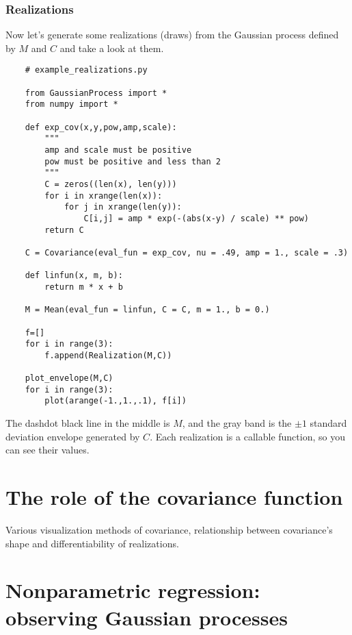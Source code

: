 \documentclass{report}
\begin{document}
\subsubsection{Realizations} 
Now let's generate some realizations (draws) from the Gaussian process defined by $M$ and $C$ and take a look at them.
\begin{small}
\begin{verbatim}
    # example_realizations.py
    
    from GaussianProcess import *
    from numpy import *

    def exp_cov(x,y,pow,amp,scale):
        """
        amp and scale must be positive
        pow must be positive and less than 2
        """
        C = zeros((len(x), len(y)))
        for i in xrange(len(x)):
            for j in xrange(len(y)):
                C[i,j] = amp * exp(-(abs(x-y) / scale) ** pow)
        return C

    C = Covariance(eval_fun = exp_cov, nu = .49, amp = 1., scale = .3)

    def linfun(x, m, b):
        return m * x + b

    M = Mean(eval_fun = linfun, C = C, m = 1., b = 0.)

    f=[]
    for i in range(3):
        f.append(Realization(M,C))

    plot_envelope(M,C)
    for i in range(3):
        plot(arange(-1.,1.,.1), f[i])
\end{verbatim}
\end{small}
The dashdot black line in the middle is $M$, and the gray band is the $\pm 1$ standard deviation envelope generated by $C$. Each realization is a callable function, so you can see their values.



\section{The role of the covariance function}\label{sec:cov_mean} %

Various visualization methods of covariance, relationship between covariance's shape and differentiability of realizations.



\section{Nonparametric regression: observing Gaussian processes}\label{sec:observing} %
\end{document}
